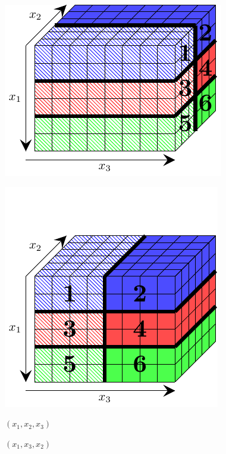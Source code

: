 \documentclass{beamer}
\begin{document}
\begin{frame}
 \begin{minipage}[b]{.45\textwidth}
  \includegraphics[width=\textwidth]{Probleme/Start}
 \end{minipage}
 \hspace{.05\textwidth}
 \begin{minipage}[b]{.45\textwidth}
  \includegraphics[width=\textwidth]{Probleme/End}
 \end{minipage}
 
 \begin{minipage}{.45\textwidth}
 \centering
 \Large
  $(x_1,x_2,x_3)$
 \end{minipage}
 \hspace{.05\textwidth}
 \begin{minipage}{.45\textwidth}
 \centering
 \Large
  $(x_1,x_3,x_2)$
 \end{minipage}

\end{frame}
\end{document}
